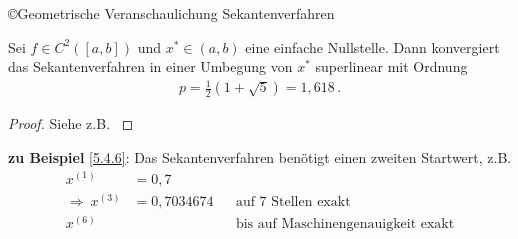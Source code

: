 \begin{image}{\copyright Geometrische Veranschaulichung Sekantenverfahren}
\end{image}
\label{im5.4.7}

\begin{Satze}
  Sei $f\in C^2([a,b])$ und $x^{*}\in (a,b)$ eine einfache Nullstelle.
  Dann konvergiert das Sekantenverfahren in einer Umbegung von $x^{*}$
  superlinear mit Ordnung 
  \begin{gather*}
    p=\frac{1}{2}(1+\sqrt{5})= 1,618 \, .
  \end{gather*}
\end{Satze}

\begin{proof}
  Siehe z.B. \cite[][Zwischenwertsatz, Fibonacci-Folge]{haemmerlinhoffmann,stoerbulirsch}
\end{proof}

\textbf{zu Beispiel} \ref{5.4.6}: Das Sekantenverfahren benötigt
einen zweiten Startwert, z.B.
\begin{align*}
  x^{(1)}&=0,7 \\
  \Rightarrow ~ x^{(3)} &= 0,7034674 
                        &&\text{auf 7 Stellen exakt}\\
  x^{(6)} &&& \text{bis auf Maschinengenauigkeit exakt}
\end{align*}


